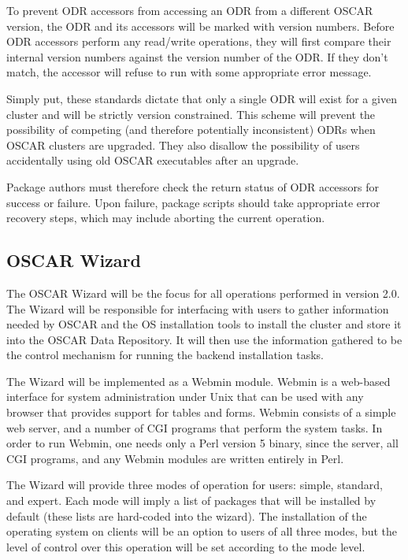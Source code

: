 To prevent ODR accessors from accessing an ODR from a different OSCAR
version, the ODR and its accessors will be marked with version
numbers.  Before ODR accessors perform any read/write operations, they
will first compare their internal version numbers against the version
number of the ODR.  If they don't match, the accessor will refuse to
run with some appropriate error message.

Simply put, these standards dictate that only a single ODR will exist
for a given cluster and will be strictly version constrained.  This
scheme will prevent the possibility of competing (and therefore
potentially inconsistent) ODRs when OSCAR clusters are upgraded.  They
also disallow the possibility of users accidentally using old OSCAR
executables after an upgrade.

Package authors must therefore check the return status of ODR
accessors for success or failure.  Upon failure, package scripts
should take appropriate error recovery steps, which may include
aborting the current operation.

\endchange

\subsection{OSCAR Wizard}
\label{sec:design-wizard}

The OSCAR Wizard will be the focus for all operations performed in
version 2.0. The Wizard will be responsible for interfacing with users
to gather information needed by OSCAR and the OS installation tools to
install the cluster and store it into the OSCAR Data Repository. It
will then use the information gathered to be the control mechanism for
running the backend installation tasks.

The Wizard will be implemented as a Webmin module. Webmin is a
web-based interface for system administration under Unix that can be
used with any browser that provides support for tables and
forms. Webmin consists of a simple web server, and a number of CGI
programs that perform the system tasks. In order to run Webmin, one
needs only a Perl version 5 binary, since the server, all CGI
programs, and any Webmin modules are written entirely in Perl.

The Wizard will provide three modes of operation for users: simple,
standard, and expert.  Each mode will imply a list of packages that
will be installed by default (these lists are hard-coded into the
wizard).  The installation of the operating system on clients will be
an option to users of all three modes, but the level of control over
this operation will be set according to the mode level.

